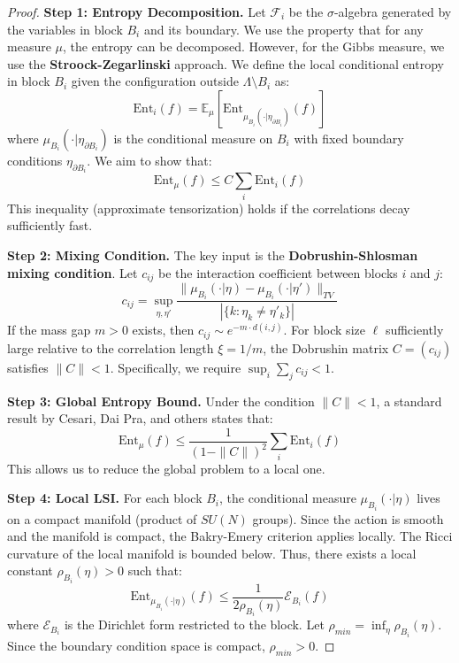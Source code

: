 \begin{proof}
\textbf{Step 1: Entropy Decomposition.}
Let $\mathcal{F}_i$ be the $\sigma$-algebra generated by the variables in block $B_i$ and its boundary.
We use the property that for any measure $\mu$, the entropy can be decomposed.
However, for the Gibbs measure, we use the \textbf{Stroock-Zegarlinski} approach.
We define the local conditional entropy in block $B_i$ given the configuration outside $\Lambda \setminus B_i$ as:
\begin{equation}
\mathrm{Ent}_{i}(f) = \mathbb{E}_\mu [ \mathrm{Ent}_{\mu_{B_i}(\cdot | \eta_{\partial B_i})}(f) ]
\end{equation}
where $\mu_{B_i}(\cdot | \eta_{\partial B_i})$ is the conditional measure on $B_i$ with fixed boundary conditions $\eta_{\partial B_i}$.
We aim to show that:
\begin{equation}
\mathrm{Ent}_{\mu}(f) \leq C \sum_i \mathrm{Ent}_{i}(f)
\end{equation}
This inequality (approximate tensorization) holds if the correlations decay sufficiently fast.

\textbf{Step 2: Mixing Condition.}
The key input is the \textbf{Dobrushin-Shlosman mixing condition}.
Let $c_{ij}$ be the interaction coefficient between blocks $i$ and $j$:
\begin{equation}
c_{ij} = \sup_{\eta, \eta'} \frac{\| \mu_{B_i}(\cdot | \eta) - \mu_{B_i}(\cdot | \eta') \|_{TV}}{|\{k : \eta_k \neq \eta'_k\}|}
\end{equation}
If the mass gap $m > 0$ exists, then $c_{ij} \sim e^{-m \cdot d(i,j)}$.
For block size $\ell$ sufficiently large relative to the correlation length $\xi = 1/m$, the Dobrushin matrix $C = (c_{ij})$ satisfies $\|C\| < 1$.
Specifically, we require $\sup_i \sum_j c_{ij} < 1$.

\textbf{Step 3: Global Entropy Bound.}
Under the condition $\|C\| < 1$, a standard result by Cesari, Dai Pra, and others states that:
\begin{equation}
\mathrm{Ent}_{\mu}(f) \leq \frac{1}{(1 - \|C\|)^2} \sum_i \mathrm{Ent}_{i}(f)
\end{equation}
This allows us to reduce the global problem to a local one.

\textbf{Step 4: Local LSI.}
For each block $B_i$, the conditional measure $\mu_{B_i}(\cdot | \eta)$ lives on a compact manifold (product of $SU(N)$ groups).
Since the action is smooth and the manifold is compact, the Bakry-Emery criterion applies locally.
The Ricci curvature of the local manifold is bounded below.
Thus, there exists a local constant $\rho_{B_i}(\eta) > 0$ such that:
\begin{equation}
\mathrm{Ent}_{\mu_{B_i}(\cdot | \eta)}(f) \leq \frac{1}{2\rho_{B_i}(\eta)} \mathcal{E}_{B_i}(f)
\end{equation}
where $\mathcal{E}_{B_i}$ is the Dirichlet form restricted to the block.
Let $\rho_{min} = \inf_{\eta} \rho_{B_i}(\eta)$. Since the boundary condition space is compact, $\rho_{min} > 0$.


\end{proof}
